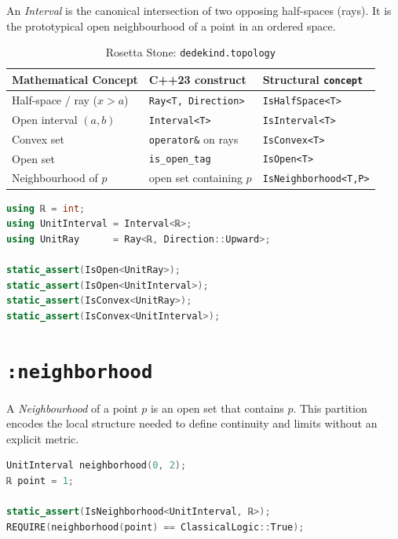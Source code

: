 \documentclass[11pt, a4paper]{report}
\begin{document}
An \emph{Interval} is the canonical intersection of two opposing half-spaces (rays). It is the prototypical open neighbourhood of a point in an ordered space.

\begin{table}[ht]
\centering
\caption{Rosetta Stone: \texttt{dedekind.topology}}
\label{table:topology}
\begin{tabular}{lll}
\toprule
\textbf{Mathematical Concept} & \textbf{C++23 construct} & \textbf{Structural \texttt{concept}} \\
\midrule
Half-space / ray ($x > a$) & \texttt{Ray<T, Direction>} & \texttt{IsHalfSpace<T>} \\
Open interval $(a, b)$ & \texttt{Interval<T>} & \texttt{IsInterval<T>} \\
Convex set & \texttt{operator\&} on rays & \texttt{IsConvex<T>} \\
Open set & \texttt{is\_open\_tag} & \texttt{IsOpen<T>} \\
Neighbourhood of $p$ & open set containing $p$ & \texttt{IsNeighborhood<T,P>} \\
\bottomrule
\end{tabular}
\end{table}

\begin{lstlisting}[language=C++, caption={Topology: open sets and convexity (from \texttt{shapes\_test.cpp}).}, label={lst:topology-interval}]
using ℝ = int;
using UnitInterval = Interval<ℝ>;
using UnitRay      = Ray<ℝ, Direction::Upward>;

static_assert(IsOpen<UnitRay>);
static_assert(IsOpen<UnitInterval>);
static_assert(IsConvex<UnitRay>);
static_assert(IsConvex<UnitInterval>);
\end{lstlisting}

\section{\texttt{:neighborhood}}
\label{sec:topology-neighborhood}

A \emph{Neighbourhood} of a point $p$ is an open set that contains $p$. This partition encodes the local structure needed to define continuity and limits without an explicit metric.

\begin{lstlisting}[language=C++, caption={Topology: neighbourhood membership (from \texttt{shapes\_test.cpp}).}, label={lst:topology-nbhd}]
UnitInterval neighborhood(0, 2);
ℝ point = 1;

static_assert(IsNeighborhood<UnitInterval, ℝ>);
REQUIRE(neighborhood(point) == ClassicalLogic::True);
\end{lstlisting}
\end{document}
